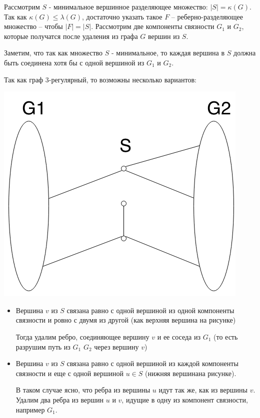 \documentclass[russian]{article}
\begin{document}
Рассмотрим $S$ - минимальное вершинное разделяющее множество: $|S| = \kappa(G)$. Так как $\kappa(G) \leqslant \lambda(G)$, достаточно указать такое $F$ -- реберно-разделяющее множество -- чтобы $|F| = |S|$. Рассмотрим две компоненты связности $G_1$ и $G_2$, которые получатся после удаления из графа $G$ вершин из $S$. 

Заметим, что так как множество $S$ - минимальное, то каждая вершина в $S$ должна быть соединена хотя бы с одной вершиной из $G_1$ и $G_2$.

Так как граф 3-регулярный, то возможны несколько вариантов:

\begin{center}
\includegraphics[scale=0.5]{6_8.png}
\par\end{center}

\begin{itemize}

\item Вершина $v$ из $S$ связана равно с одной вершиной из одной компоненты связности и ровно с двумя из другой (как верхняя вершина на рисунке)

Тогда удалим ребро, соединяющее вершину $v$ и ее соседа из $G_1$ (то есть разрушим путь из $G_1$ $G_2$ через вершину $v$)

\item Вершина $v$ из $S$ связана равно с одной вершиной из каждой компоненты связности и еще с одной вершиной $u \in S$ (нижняя вершинана рисунке).

В таком случае ясно, что ребра из вершины $u$ идут так же, как из вершины $v$. Удалим два ребра из вершин $u$ и $v$, идущие в одну из компонент связности, например $G_1$.
\end{itemize}
\end{document}
